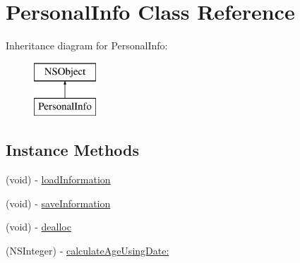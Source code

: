 \hypertarget{interface_personal_info}{\section{Personal\-Info Class Reference}
\label{interface_personal_info}
}
Inheritance diagram for Personal\-Info\-:\begin{figure}[H]
\begin{center}
\leavevmode
\includegraphics[height=2.000000cm]{interface_personal_info}
\end{center}
\end{figure}
\subsection*{Instance Methods}
\begin{DoxyCompactItemize}
\item 
(void) -\/ \hyperlink{interface_personal_info_a837ce1e3fe6b67a415629e395ce9367e}{load\-Information}
\item 
(void) -\/ \hyperlink{interface_personal_info_a74efb2fadb7b9358f743830b49755567}{save\-Information}
\item 
(void) -\/ \hyperlink{interface_personal_info_ae2b7828f42d1577ed2200b05ceafff26}{dealloc}
\item 
(N\-S\-Integer) -\/ \hyperlink{interface_personal_info_a21553b6f3de4bdbd30eded3d18c44b0b}{calculate\-Age\-Using\-Date\-:}
\end{DoxyCompactItemize}
